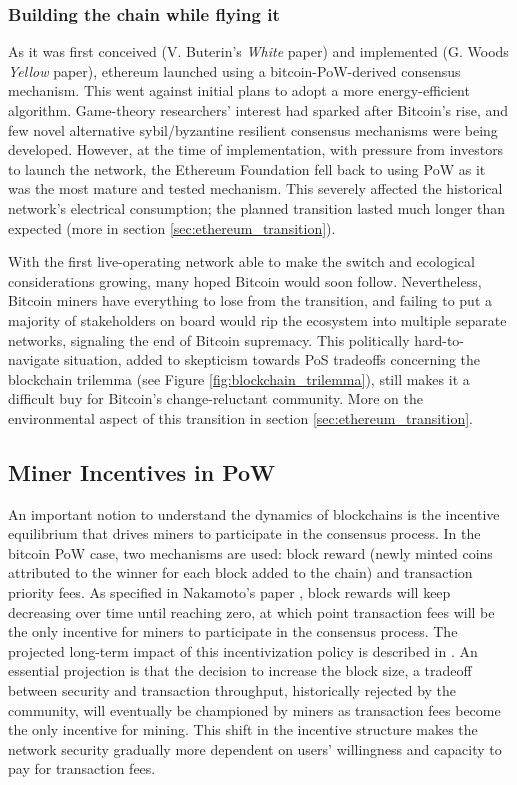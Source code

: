 \documentclass[11pt]{report}
\begin{document}
\subsubsection{Building the chain while flying it}
As it was first conceived (V. Buterin's \textit{White} paper) \cite{buterinEthereumNextgenerationSmart} and implemented (G. Woods \textit{Yellow} paper)\cite{woodEthereumSecuredDecentralised2023}, ethereum launched using a bitcoin-PoW-derived consensus mechanism. This went against initial plans to adopt a more energy-efficient algorithm. Game-theory researchers' interest had sparked after Bitcoin's rise, and few novel alternative sybil/byzantine resilient consensus mechanisms were being developed. However, at the time of implementation, with pressure from investors to launch the network, the Ethereum Foundation fell back to using PoW as it was the most mature and tested mechanism. This severely affected the historical network's electrical consumption; the planned transition lasted much longer than expected (more in section \ref{sec:ethereum_transition}).

With the first live-operating network able to make the switch and ecological considerations growing, many hoped Bitcoin would soon follow.  Nevertheless, Bitcoin miners have everything to lose from the transition, and failing to put a majority of stakeholders on board would rip the ecosystem into multiple separate networks, signaling the end of Bitcoin supremacy. This politically hard-to-navigate situation, added to skepticism towards PoS tradeoffs concerning the blockchain trilemma (see Figure \ref{fig:blockchain_trilemma}), still makes it a difficult buy for Bitcoin's change-reluctant community. More on the environmental aspect of this transition in section \ref{sec:ethereum_transition}.

\subsection{Miner Incentives in \ac{PoW}}

An important notion to understand the dynamics of blockchains is the incentive equilibrium that drives miners to participate in the consensus process. In the bitcoin \ac{PoW} case, two mechanisms are used: block reward (newly minted coins attributed to the winner for each block added to the chain) and transaction priority fees. As specified in Nakamoto's paper \cite{nakamotoBitcoinPeertopeerElectronic2008}, block rewards will keep decreasing over time until reaching zero, at which point transaction fees will be the only incentive for miners to participate in the consensus process. The projected long-term impact of this incentivization policy is described in \cite{easleyMiningMarketsEvolution2019}. An essential projection is that the decision to increase the block size, a tradeoff between security and transaction throughput, historically rejected by the community, will eventually be championed by miners as transaction fees become the only incentive for mining. This shift in the incentive structure makes the network security gradually more dependent on users' willingness and capacity to pay for transaction fees.
\end{document}
